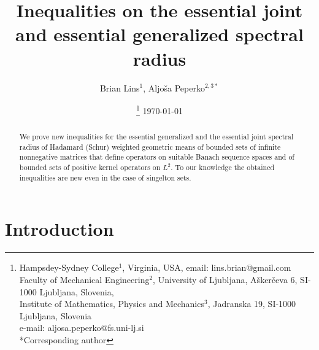 \documentclass[12pt, reqno]{amsart}
\theoremstyle{definition}
\theoremstyle{remark}
\numberwithin{equation}{section}
\begin{document}
\setcounter{page}{1}

\title[Essential joint and essential generalized spectral radius]{Inequalities on the essential joint and essential generalized spectral radius}


\author{ Brian Lins$^{1}$, Aljo\v{s}a Peperko$^{2,3*}$}
\date{\thanks{
Hampsdey-Sydney College$^1$,
Virginia, USA,
email: lins.brian@gmail.com
  \\
Faculty of Mechanical Engineering$^2$,
University of Ljubljana,
A\v{s}ker\v{c}eva 6,
SI-1000 Ljubljana, Slovenia,\\
Institute of Mathematics, Physics and Mechanics$^3$,
Jadranska 19,
SI-1000 Ljubljana, Slovenia \\
e-mail:   aljosa.peperko@fs.uni-lj.si\\
*Corresponding author
} \today}






\begin{abstract}
We prove new inequalities for the essential generalized and the essential joint spectral radius of Hadamard (Schur) weighted geometric means of bounded sets of infinite nonnegative matrices that define operators on suitable  Banach  sequence spaces and of bounded sets of positive kernel operators on $L^2$. To our knowledge the obtained inequalities are new even in the case of singelton sets.
\end{abstract} \maketitle

\section{Introduction}
\end{document}
